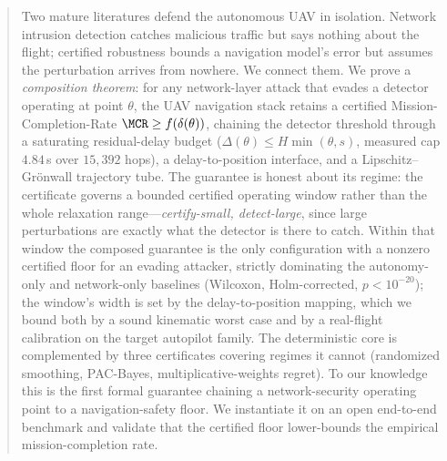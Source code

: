 \begin{abstract}
Two mature literatures defend the autonomous UAV in isolation. Network
intrusion detection catches malicious traffic but says nothing about the flight;
certified robustness bounds a navigation model's error but assumes the
perturbation arrives from nowhere. We connect them. We prove a \emph{composition
theorem}: for any network-layer attack that evades a detector operating at point
$\theta$, the UAV navigation stack retains a certified Mission-Completion-Rate
$\MCR\ge f(\delta(\theta))$, chaining the detector threshold through a saturating
residual-delay budget ($\Delta(\theta)\le H\min(\theta,s)$, measured cap
$4.84$\,s over $15{,}392$ hops), a delay-to-position interface, and a
Lipschitz--Grönwall trajectory tube. The guarantee is honest about its regime:
the certificate governs a bounded certified operating window rather than the
whole relaxation range---\emph{certify-small, detect-large}, since large
perturbations are exactly what the detector is there to catch. Within that
window the composed guarantee is the only configuration with a nonzero certified
floor for an evading attacker, strictly dominating the autonomy-only and
network-only baselines (Wilcoxon, Holm-corrected, $p<10^{-20}$); the window's
width is set by the delay-to-position mapping, which we bound both by a sound
kinematic worst case and by a real-flight calibration on the target autopilot
family. The deterministic core is complemented by three certificates covering
regimes it cannot (randomized smoothing, PAC-Bayes, multiplicative-weights
regret). To our knowledge this is the first formal guarantee chaining a
network-security operating point to a navigation-safety floor. We instantiate it
on an open end-to-end benchmark and validate that the certified floor
lower-bounds the empirical mission-completion rate.
\end{abstract}
